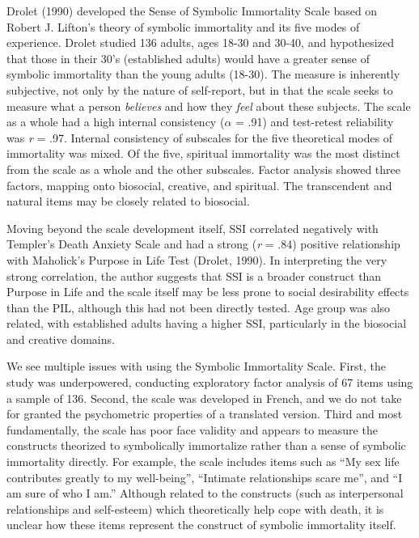 \documentclass[
  english,
  man]{apa6}
\begin{document}
Drolet (1990) developed the Sense of Symbolic Immortality Scale
based on Robert J. Lifton's theory of symbolic immortality and its five
modes of experience. Drolet studied 136 adults, ages 18-30 and 30-40,
and hypothesized that those in their 30's (established adults) would
have a greater sense of symbolic immortality than the young adults
(18-30). The measure is inherently subjective, not only by the nature of
self-report, but in that the scale seeks to measure what a person
\emph{believes} and how they \emph{feel} about these subjects. The scale as a
whole had a high internal consistency (\(\alpha\) = .91) and test-retest
reliability was \emph{r} = .97. Internal consistency of subscales for the
five theoretical modes of immortality was mixed. Of the five, spiritual
immortality was the most distinct from the scale as a whole and the
other subscales. Factor analysis showed three factors, mapping onto
biosocial, creative, and spiritual. The transcendent and natural items
may be closely related to biosocial.

Moving beyond the scale development itself, SSI correlated negatively
with Templer's Death Anxiety Scale and had a strong (\emph{r} = .84) positive
relationship with Maholick's Purpose in Life Test (Drolet, 1990). In
interpreting the very strong correlation, the author suggests that SSI
is a broader construct than Purpose in Life and the scale itself may be
less prone to social desirability effects than the PIL, although this
had not been directly tested. Age group was also related, with
established adults having a higher SSI, particularly in the biosocial
and creative domains.

We see multiple issues with using the Symbolic Immortality Scale. First,
the study was underpowered, conducting exploratory factor analysis of 67
items using a sample of 136. Second, the scale was developed in French,
and we do not take for granted the psychometric properties of a
translated version. Third and most fundamentally, the scale has poor
face validity and appears to measure the constructs theorized to
symbolically immortalize rather than a sense of symbolic immortality
directly. For example, the scale includes items such as ``My sex life
contributes greatly to my well-being'', ``Intimate relationships scare
me'', and ``I am sure of who I am.'' Although related to the constructs
(such as interpersonal relationships and self-esteem) which
theoretically help cope with death, it is unclear how these items
represent the construct of symbolic immortality itself.
\end{document}
